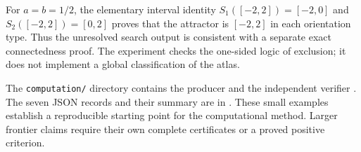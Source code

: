 For $a=b=1/2$, the elementary interval identity
$S_1([-2,2])=[-2,0]$ and $S_2([-2,2])=[0,2]$ proves that the attractor is
$[-2,2]$ in each orientation type. Thus the unresolved search output is
consistent with a separate exact connectedness proof. The experiment checks
the one-sided logic of exclusion; it does not implement a global classification
of the atlas.

The \texttt{computation/} directory contains the producer
 and the independent verifier
. The seven JSON records and their
summary are in . These small examples establish
a reproducible starting point for the computational method. Larger frontier
claims require their own complete certificates or a proved positive criterion.
